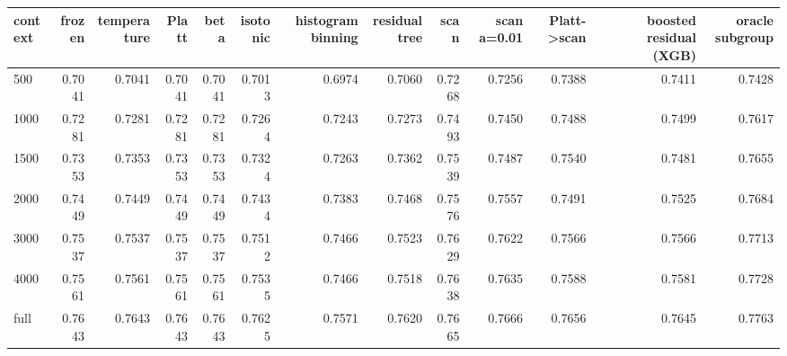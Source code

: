 \begin{tabular}{lrrrrrrrrrrrr}
\toprule
context & frozen & temperature & Platt & beta & isotonic & histogram binning & residual tree & scan & scan a=0.01 & Platt->scan & boosted residual (XGB) & oracle subgroup \\
\midrule
500 & 0.7041 & 0.7041 & 0.7041 & 0.7041 & 0.7013 & 0.6974 & 0.7060 & 0.7268 & 0.7256 & 0.7388 & 0.7411 & 0.7428 \\
1000 & 0.7281 & 0.7281 & 0.7281 & 0.7281 & 0.7264 & 0.7243 & 0.7273 & 0.7493 & 0.7450 & 0.7488 & 0.7499 & 0.7617 \\
1500 & 0.7353 & 0.7353 & 0.7353 & 0.7353 & 0.7324 & 0.7263 & 0.7362 & 0.7539 & 0.7487 & 0.7540 & 0.7481 & 0.7655 \\
2000 & 0.7449 & 0.7449 & 0.7449 & 0.7449 & 0.7434 & 0.7383 & 0.7468 & 0.7576 & 0.7557 & 0.7491 & 0.7525 & 0.7684 \\
3000 & 0.7537 & 0.7537 & 0.7537 & 0.7537 & 0.7512 & 0.7466 & 0.7523 & 0.7629 & 0.7622 & 0.7566 & 0.7566 & 0.7713 \\
4000 & 0.7561 & 0.7561 & 0.7561 & 0.7561 & 0.7535 & 0.7466 & 0.7518 & 0.7638 & 0.7635 & 0.7588 & 0.7581 & 0.7728 \\
full & 0.7643 & 0.7643 & 0.7643 & 0.7643 & 0.7625 & 0.7571 & 0.7620 & 0.7665 & 0.7666 & 0.7656 & 0.7645 & 0.7763 \\
\bottomrule
\end{tabular}

